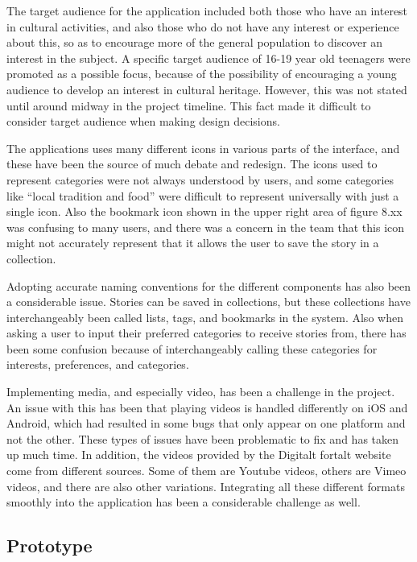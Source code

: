 The target audience for the application included both those who have an interest in cultural activities, and also those who do not have any interest or experience about this, so as to encourage more of the general population to discover an interest in the subject. A specific target audience of 16-19 year old teenagers were promoted as a possible focus, because of the possibility of encouraging a young audience to develop an interest in cultural heritage. However, this was not stated until around  midway in the project timeline. This fact made it difficult to consider target audience when making design decisions. \newline

The applications uses many different icons in various parts of the interface, and these have been the source of much debate and redesign. The icons used to represent categories were not always understood by users, and some categories like “local tradition and food” were difficult to represent universally with just a single icon. Also the bookmark icon shown in the upper right area of figure 8.xx was confusing to many users, and there was a concern in the team that this icon might not accurately represent that it allows the user to save the story in a collection.\newline

Adopting accurate naming conventions for the different components has also been a considerable issue. Stories can be saved in collections, but these collections have interchangeably been called lists, tags, and bookmarks in the system. Also when asking a user to input their preferred categories to receive stories from, there has been some confusion because of interchangeably calling these categories for interests,  preferences, and categories.\newline

Implementing media, and especially video, has been a challenge in the project. An issue with this has been that playing videos is handled differently on iOS and Android, which had resulted in some bugs that only appear on one platform and not the other. These types of issues have been problematic to fix and has taken up much time. In addition, the videos provided by the Digitalt fortalt website come from different sources. Some of them are Youtube videos, others are Vimeo videos, and there are also other variations. Integrating all these different formats smoothly into the application has been a considerable challenge as well.

\subsection{Prototype}

